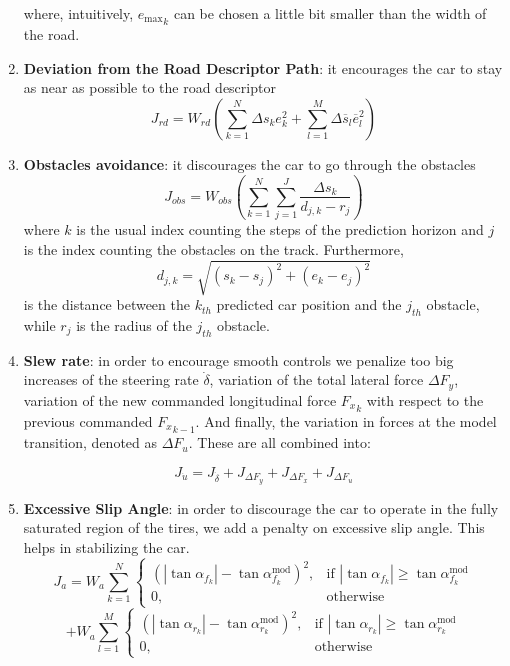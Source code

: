 \documentclass[a4paper, onecolumn, 12pt]{article}
\begin{document}
\begin{enumerate}
    where, intuitively, ${e_{\text{max}}}_k$ can be chosen a little bit smaller than the width of the road.

    \item \textbf{Deviation from the Road Descriptor Path}: it encourages the car to stay as near as possible to the road descriptor
    \begin{equation}
    J_{rd} = W_{rd} \left( \sum_{k=1}^{N} \Delta s_k e_k^2 + \sum_{l=1}^{M} \Delta\overline{s}_l \overline{e}_l^2 \right)
    \end{equation}

    \item \textbf{Obstacles avoidance}: it discourages the car to go through the obstacles
    \begin{equation}
        J_{obs} = W_{obs} \left( \sum_{k=1}^{N} \sum_{j=1}^{J} \frac{\Delta s_k}{d_{j,k} - r_j} \right)
    \end{equation}
    where $k$ is the usual index counting the steps of the prediction horizon
    and $j$ is the index counting the obstacles on the track. Furthermore,
    \[d_{j,k} = \sqrt{(s_k-s_j)^2 + (e_k-e_j)^2}\] is the distance between the
    $k_{th}$ predicted car position and the $j_{th}$ obstacle, while $r_j$ is
    the radius of the $j_{th}$ obstacle.

    \item \textbf{Slew rate}: in order to encourage smooth controls we penalize too big increases of the steering rate $\dot{\delta}$, variation of the total lateral force $\Delta F_y$, variation of the new commanded longitudinal force ${F_x}_k$ with respect to the previous commanded ${F_x}_{k-1}$.
    And finally, the variation in forces at the model transition, denoted as $\Delta F_u$.
    These are all combined into:
    
    \begin{equation}
        J_{\dot{u}} = J_{\dot{\delta}} + J_{\Delta F_y} + J_{\Delta F_x} + J_{\Delta F_u}
    \end{equation}

    \item \textbf{Excessive Slip Angle}: in order to discourage the car to operate in the fully saturated region of the tires, we add a penalty on excessive slip angle. This helps in stabilizing the car.
    \begin{equation}
        J_{a} = W_{a}\sum_{k=1}^{N}
        \begin{cases}
        \left(|\tan \alpha_{f_k}|-\tan \alpha_{f_k}^{\text{mod}}\right)^2, & \text{if } |\tan \alpha_{f_k}| \geq  \tan \alpha_{f_k}^{\text{mod}}\\
        0, & \text{otherwise}
        \end{cases}
        \end{equation}
        \[  + W_{a}\sum_{l=1}^{M} 
        \begin{cases}
        \left(|\tan \alpha_{r_k}|-\tan \alpha_{r_k}^{\text{mod}}\right)^2, & \text{if } |\tan \alpha_{r_k}| \geq  \tan \alpha_{r_k}^{\text{mod}}\\
        0, & \text{otherwise}
        \end{cases}
        \]
\end{enumerate}
\end{document}
